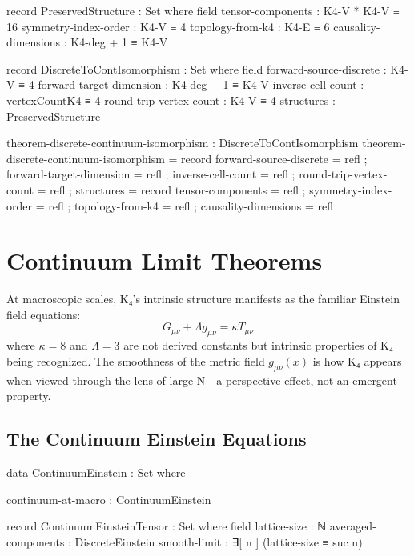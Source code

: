 \documentclass[11pt,a4paper]{book}
\begin{document}
\begin{code}
record PreservedStructure : Set where
  field
    tensor-components : K4-V * K4-V ≡ 16
    symmetry-index-order : K4-V ≡ 4
    topology-from-k4 : K4-E ≡ 6
    causality-dimensions : K4-deg + 1 ≡ K4-V

record DiscreteToContIsomorphism : Set where
  field
    forward-source-discrete : K4-V ≡ 4
    forward-target-dimension : K4-deg + 1 ≡ K4-V
    inverse-cell-count : vertexCountK4 ≡ 4
    round-trip-vertex-count : K4-V ≡ 4
    structures : PreservedStructure

theorem-discrete-continuum-isomorphism : DiscreteToContIsomorphism
theorem-discrete-continuum-isomorphism = record
  { forward-source-discrete = refl
  ; forward-target-dimension = refl
  ; inverse-cell-count = refl
  ; round-trip-vertex-count = refl
  ; structures = record
      { tensor-components = refl
      ; symmetry-index-order = refl
      ; topology-from-k4 = refl
      ; causality-dimensions = refl
      }
  }
\end{code}

\chapter{Continuum Limit Theorems}
\label{chap:continuum-physics}

At macroscopic scales, K₄'s intrinsic structure manifests as the familiar Einstein field equations:
\[
G_{\mu\nu} + \Lambda g_{\mu\nu} = \kappa T_{\mu\nu}
\]
where $\kappa = 8$ and $\Lambda = 3$ are not derived constants but intrinsic properties of K₄ being recognized. The smoothness of the metric field $g_{\mu\nu}(x)$ is how K₄ appears when viewed through the lens of large N—a perspective effect, not an emergent property.

\section{The Continuum Einstein Equations}

\begin{code}
data ContinuumEinstein : Set where

  continuum-at-macro : ContinuumEinstein

record ContinuumEinsteinTensor : Set where
  field
    lattice-size : ℕ
    averaged-components : DiscreteEinstein
    smooth-limit : ∃[ n ] (lattice-size ≡ suc n)

\end{code}
\end{document}
